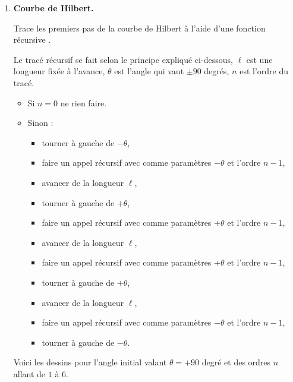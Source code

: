 \documentclass[11pt,class=report,crop=false]{standalone}
\begin{document}
\begin{activite}
\begin{enumerate}
  \item \textbf{Courbe de Hilbert.}
  
  Trace les premiers pas de la courbe de Hilbert à l'aide d'une fonction récursive
  . 
  
  Le tracé récursif se fait selon le principe expliqué ci-dessous, $\ell$ est une longueur fixée à l'avance, $\theta$ est l'angle qui vaut $\pm 90$ degrés, $n$ est l'ordre du tracé.
  
\begin{itemize}
  \item Si $n=0$ ne rien faire.
  \item Sinon :
  \begin{itemize}
    \item tourner à gauche de $-\theta$,
    \item faire un appel récursif avec comme paramètres $-\theta$ et l'ordre $n-1$,
    \item avancer de la longueur $\ell$,
    \item tourner à gauche de $+\theta$,
    \item faire un appel récursif avec comme paramètres $+\theta$ et l'ordre $n-1$,
    \item avancer de la longueur $\ell$,
    \item faire un appel récursif avec comme paramètres $+\theta$ et l'ordre $n-1$,
    \item tourner à gauche de $+\theta$, 
    \item avancer de la longueur $\ell$,   
    \item faire un appel récursif avec comme paramètres $-\theta$ et l'ordre $n-1$,                
    \item tourner à gauche de $-\theta$.
  \end{itemize}
\end{itemize}
  
  
  Voici les dessins pour l'angle initial valant $\theta = +90$ degré et des ordres $n$ allant de $1$ à $6$.
  

\end{enumerate}
\end{activite}
\end{document}
